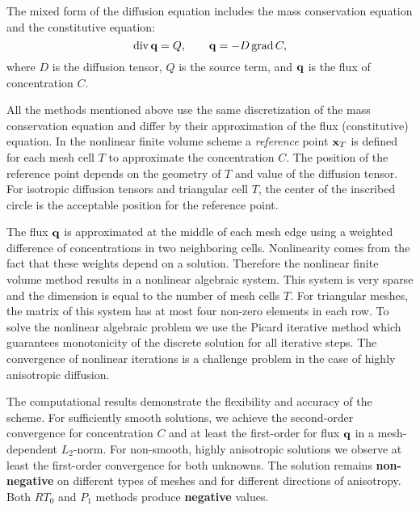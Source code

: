 \documentclass{report}
\begin{document}
The mixed form of the diffusion equation includes the mass conservation equation
and the constitutive equation:
\begin{equation}
{\rm div} \, {\bf q} = Q, \qquad {\bf q} = - D\, {\rm grad}\, C,
\nonumber
\end{equation}
where $ D$ is the diffusion tensor, $Q$ is the source term, and $\bf q$ is the
flux of concentration $C$.


All the methods mentioned above use the same discretization of the mass
conservation equation
and differ by their approximation of the flux (constitutive) equation.
In the nonlinear finite volume scheme a {\it reference} point ${\bf x}_T$ is defined for
each mesh cell $T$ to approximate the concentration $C$. The position of
the reference point
depends on the geometry of $T$ and value of the diffusion tensor.
For isotropic diffusion tensors and triangular cell $T$, the center of
the inscribed circle
is the acceptable position for the reference point.

The flux $\bf q$ is approximated at the middle of each mesh
edge using a weighted difference of concentrations in two neighboring
cells. Nonlinearity comes from the fact that these weights
depend on a solution. Therefore the nonlinear finite volume method
results in a nonlinear algebraic system.
This system is very sparse and the dimension is equal to the number of mesh cells $T$.
For triangular meshes, the matrix of this system has at most four
non-zero elements in each row.
To solve the nonlinear algebraic problem we use the Picard iterative
method which guarantees monotonicity of the
discrete solution for all iterative steps. The convergence of nonlinear
iterations is a challenge problem in the case of highly anisotropic
diffusion.

The computational results demonstrate the flexibility and accuracy of the scheme.
For sufficiently smooth solutions, we achieve the
second-order convergence for concentration $C$ and at least the first-order for flux
${\bf q}$ in a mesh-dependent $L_2$-norm. For non-smooth, highly anisotropic solutions
we observe at least the first-order convergence for both unknowns.
The solution remains {\bf non-negative} on different types of meshes and for different
directions of anisotropy.
Both $RT_0$ and $P_1$ methods produce {\bf negative} values.
\end{document}
